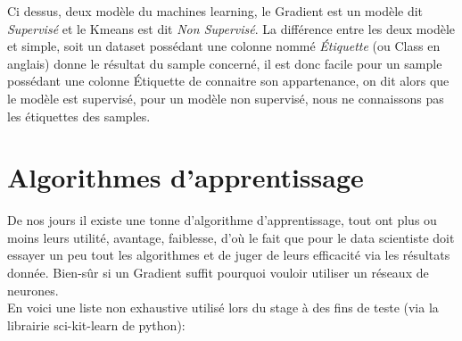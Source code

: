 Ci dessus, deux modèle du machines learning, le Gradient est un modèle dit \textit{Supervisé} et le Kmeans est dit \textit{Non Supervisé}. La différence entre les deux modèle et simple, soit un dataset possédant une colonne nommé \textit{Étiquette} (ou Class en anglais) donne le résultat du sample concerné, il est donc facile pour un sample possédant une colonne Étiquette de connaitre son appartenance, on dit alors que le modèle est supervisé, pour un modèle non supervisé, nous ne connaissons pas les étiquettes des samples.\\
\pagebreak

\section{Algorithmes d'apprentissage}

De nos jours il existe une tonne d'algorithme d'apprentissage, tout ont plus ou moins leurs utilité, avantage, faiblesse, d'où le fait que pour le data scientiste doit essayer un peu tout les algorithmes et de juger de leurs efficacité via les résultats donnée. Bien-sûr si un Gradient suffit pourquoi vouloir utiliser un réseaux de neurones.\\
En voici une liste non exhaustive utilisé lors du stage à des fins de teste (via la librairie sci-kit-learn de python):

